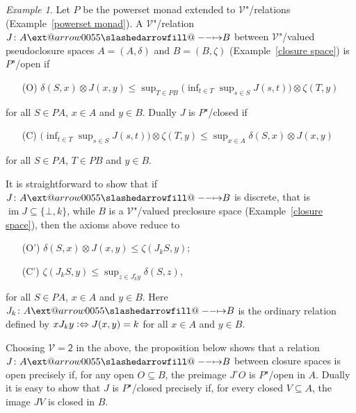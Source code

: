 \documentclass[preprint, a4paper]{elsarticle}
\makeatletter
\def\slashedarrowfill@#1#2#3#4#5{%
  $\m@th\thickmuskip0mu\medmuskip\thickmuskip\thinmuskip\thickmuskip
   \relax#5#1\mkern-7mu%
   \cleaders\hbox{$#5\mkern-2mu#2\mkern-2mu$}\hfill
   \mathclap{#3}\mathclap{#2}%
   \cleaders\hbox{$#5\mkern-2mu#2\mkern-2mu$}\hfill
   \mkern-7mu#4$%
}
\def\rightslashedarrowfill@{%
  \slashedarrowfill@\relbar\relbar\mapstochar\rightarrow}
\newcommand\xslashedrightarrow[2][]{%
  \ext@arrow 0055{\rightslashedarrowfill@}{#1}{#2}}
\def\slashedrightarrow{\xslashedrightarrow{}}
\theoremstyle{definition}
\theoremstyle{remark}
\newtheorem{example}[theorem]{Example}
\providecommand{\exref}[1]{Example~\ref{#1}}
\newcommand\defeq{\mathrel{\vcentcolon\Leftrightarrow}}
\providecommand{\tens}{\otimes}
\providecommand{\brcs}[1]{\lbrace #1 \rbrace}
\providecommand{\bigpars}[1]{\bigl(#1\bigr)}
\providecommand{\set}[1]{\brcs{#1}}
\providecommand{\rev}[1]{#1^\circ}
\providecommand{\hmap}[3]{#1\colon#2\slashedrightarrow#3}
\DeclareMathOperator{\im}{im}
\providecommand{\catvar}[1]{\mathcal{#1}}
\providecommand{\2}{\mathsf 2}
\providecommand{\V}{\catvar V}
\makeatother
\begin{document}
	\begin{example} \label{open/closed relations}
		Let $P$ be the powerset monad extended to $\V$"/relations (\exref{powerset monad}). A $\V$"/relation $\hmap JAB$ between $\V$"/valued pseudoclosure spaces $A = (A, \delta)$ and $B = (B, \zeta)$ (\exref{closure space}) is $P$"/open if
		\begin{enumerate}
			\item[(O)] $\displaystyle\delta(S, x) \tens J(x, y) \leq \sup_{T \in PB} \bigpars{\inf_{t \in T}\sup_{s \in S} J(s, t)} \tens \zeta(T, y)$ 
		\end{enumerate}
		for all $S \in PA$, $x \in A$ and $y \in B$. Dually $J$ is $P$"/closed if
		\begin{enumerate}
			\item[(C)] $\displaystyle\bigpars{\inf_{t \in T}\sup_{s \in S}J(s, t)} \tens \zeta(T, y) \leq \sup_{x \in A} \delta(S, x) \tens J(x,y)$
		\end{enumerate}
		for all $S \in PA$, $T \in PB$ and $y \in B$.
		
		It is straightforward to show that if $\hmap JAB$ is discrete, that is $\im J \subseteq \set{\bot, k}$, while $B$ is a $\V$"/valued preclosure space (\exref{closure space}), then the axioms above reduce to
		\begin{enumerate}
			\item[(O')] $\delta(S, x) \tens J(x, y) \leq \zeta(J_k S, y)$;
			\item[(C')] $\zeta(J_k S, y) \leq \displaystyle\sup_{z \in \rev J_k y} \delta(S, z)$,
		\end{enumerate}
		for all $S \in PA$, $x \in A$ and $y \in B$. Here $\hmap{J_k}AB$ is the ordinary relation defined by $xJ_ky \defeq J(x, y) = k$ for all $x \in A$ and $y \in B$.
		
		Choosing $\V = \2$ in the above, the proposition below shows that a relation $\hmap JAB$ between closure spaces is open precisely if, for any open $O \subseteq B$, the preimage $\rev JO$ is $P$"/open in $A$. Dually it is easy to show that $J$ is $P$"/closed precisely if, for every closed $V \subseteq A$, the image $JV$ is closed in $B$.
	\end{example}
	
\end{document}
